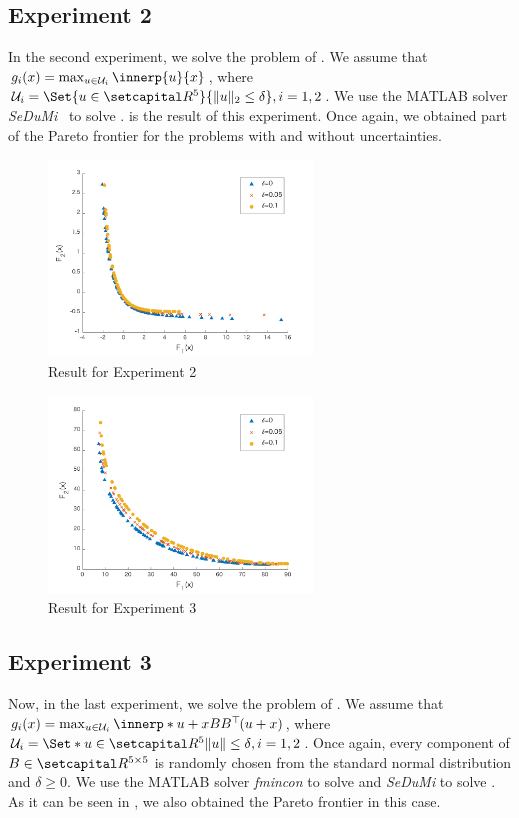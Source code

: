 \documentclass[../main]{subfiles}
\begin{document}
\subsection*{Experiment 2}
In the second experiment, we solve the problem of . We assume that $g_i(x) = \max_{u \in \mathcal{U}_i } \innerp{u}{x}$, where $\mathcal{U}_i = \Set{u \in \setR^5 }{ \norm{u}_2 \leq \delta }, i = 1, 2$. We use the MATLAB solver \emph{SeDuMi}~\cite{Sturm1999} to solve .
 is the result of this experiment.
Once again, we obtained part of the Pareto frontier for the problems with and without uncertainties.
\begin{figure}[htbp]
    \centering
    \includegraphics[clip, width = 7.0cm]{figs/linear_ellipsoid_without_line_search}
    \caption{Result for Experiment 2}
\end{figure}
\begin{figure}[thbp]
    \centering
    \includegraphics[clip, width = 7.0cm]{figs/quadratic_ellipsoid_without_line_search}
    \caption{Result for Experiment 3}
\end{figure}
\subsection*{Experiment 3}
Now, in the last experiment, we solve the problem of .
We assume that $g_i(x) = \max_{u \in \mathcal{U}_i } \innerp*{u + x}{B B^\T (u + x)}$, where $\mathcal{U}_i = \Set*{u \in \setR^5}{\norm{u} \leq \delta}, i = 1, 2$.
Once again, every component of $B \in \setR^{5 \times 5}$ is randomly chosen from the standard normal distribution and $\delta \geq 0$. We use the MATLAB solver \emph{fmincon} to solve  and \emph{SeDuMi} to solve . As it can be seen in , we also obtained the Pareto frontier in this case.
\end{document}
